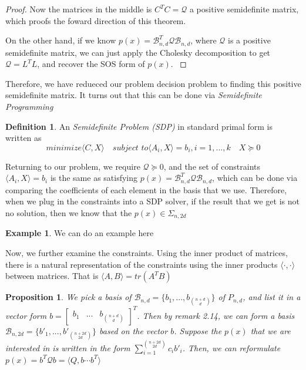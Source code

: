\documentclass[12pt]{amsart}
\numberwithin{equation}{section}
\newtheorem{prop}[thm]{Proposition}
\theoremstyle{definition}
\newtheorem{definition}[thm]{Definition}
\newtheorem{example}[thm]{Example}
\numberwithin{thm}{section}
\begin{document}
\begin{proof}
     Now the matrices in the middle is $C^T C = \mathcal{Q}$ a positive semidefinite matrix, which proofs the foward direction of this theorem.

     On the other hand, if we know $p(x) = \mathcal{B}_{n, d}^T \mathcal{Q} \mathcal{B}_{n, d}$, where $\mathcal{Q}$ is a positive semidefinite matrix, we can just apply the Cholesky decomposition to get $\mathcal{Q} = L^T L$, and recover the SOS form of $p(x)$. \cite{Blekherman:Parrilo:Thomas}
\end{proof}

\smallskip
Therefore, we have redueced our problem decision problem to finding this positive semidefinite matrix. It turns out that this can be done via \emph{Semidefinite Programming} \cite{Blekherman:Parrilo:Thomas}
\begin{definition}
     An \emph{Semidefinite Problem (SDP)} in standard primal form is written as
     \begin{equation}
          \textit{minimize} \langle C, X \rangle \quad \textit{subject to} \langle A_i, X \rangle = b_i, i=1,...,k \quad X \succcurlyeq 0
     \end{equation}
\end{definition}

Returning to our problem, we require $\mathcal{Q} \succcurlyeq 0$, and the set of constraints $ \langle A_i, X \rangle = b_i$ is the same as satisfying $p(x) = \mathcal{B}_{n, d}^T \mathcal{Q} \mathcal{B}_{n, d}$, which can be done via comparing the coefficients of each element in the basis that we use. \cite{Recher:Masterthesis} 
Therefore, when we plug in the constraints into a SDP solver, if the result that we get is not no solution, then we know that the $p(x) \in \Sigma_{n, 2d}$

\begin{example}
     We can do an example here
\end{example}

\smallskip
Now, we further examine the constraints. Using the inner product of matrices, there is a natural representation of the constraints using the inner products $\langle \cdot,  \cdot \rangle$ between matrices. That is $\langle A, B \rangle = tr(A^T B)$ 

\begin{prop}

     We pick a basis of $\mathcal{B}_{n, d} = \{b_1, ..., b_{n + d \choose d}\}$ of $P_{n, d}$, and list it in a vector form $ b =\begin{bmatrix}
          b_1 &
          ... &
          b_{ n+ d \choose d}
     \end{bmatrix} ^ T$. Then by remark 2.14, we can form a basis $\mathcal{B}_{n, 2d} = \{b'_1, ..., b'_{n + 2d \choose 2d}\}$ based on the vector $b$. 
     Suppose the $p(x)$ that we are interested in is written in the form $\sum_{i = 1}^{n + 2d \choose 2d } c_i b'_i$.
     Then, we can reformulate $p(x) = b^T \mathcal{Q} b = \langle Q, b \cdots b^T \rangle$ 
\end{prop}
\end{document}
